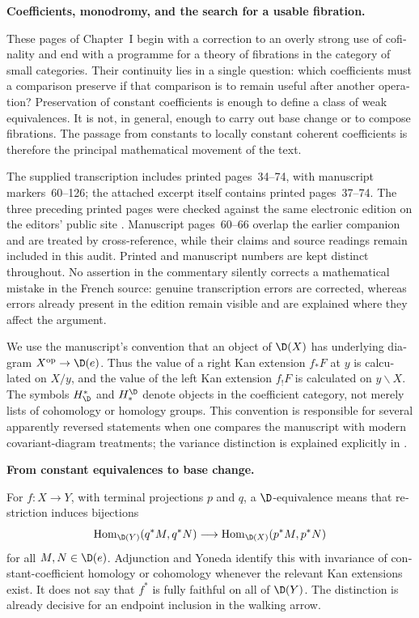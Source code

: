 \begin{otherlanguage}{english}
\noindent\textbf{Coefficients, monodromy, and the search for a usable fibration.}

These pages of Chapter~I begin with a correction to an overly strong use of cofinality and end with a programme for a theory of fibrations in the category of small categories. Their continuity lies in a single question: which coefficients must a comparison preserve if that comparison is to remain useful after another operation? Preservation of constant coefficients is enough to define a class of weak equivalences. It is not, in general, enough to carry out base change or to compose fibrations. The passage from constants to locally constant coherent coefficients is therefore the principal mathematical movement of the text.

The supplied transcription includes printed pages~34--74, with manuscript markers~60--126; the attached excerpt itself contains printed pages~37--74. The three preceding printed pages were checked against the same electronic edition on the editors' public site \citep{Grothendieck1990Derivateurs}. Manuscript pages~60--66 overlap the earlier companion and are treated by cross-reference, while their claims and source readings remain included in this audit. Printed and manuscript numbers are kept distinct throughout. No assertion in the commentary silently corrects a mathematical mistake in the French source: genuine transcription errors are corrected, whereas errors already present in the edition remain visible and are explained where they affect the argument.

We use the manuscript's convention that an object of $\D(X)$ has underlying diagram $X^{\mathrm{op}}\to\D(e)$. Thus the value of a right Kan extension $f_*F$ at $y$ is calculated on $X/y$, and the value of the left Kan extension $f_!F$ is calculated on $y\backslash X$. The symbols $H^*_{\D}$ and $H_*^{\D}$ denote objects in the coefficient category, not merely lists of cohomology or homology groups. This convention is responsible for several apparently reversed statements when one compares the manuscript with modern covariant-diagram treatments; the variance distinction is explained explicitly in \citet[Warning~2.2]{GrothPontoShulman2014}.

\medskip\noindent\textbf{From constant equivalences to base change.}

For $f:X\to Y$, with terminal projections $p$ and $q$, a $\D$-equivalence means that restriction induces bijections
\[
 \operatorname{Hom}_{\D(Y)}(q^*M,q^*N)
 \longrightarrow
 \operatorname{Hom}_{\D(X)}(p^*M,p^*N)
\]
for all $M,N\in\D(e)$. Adjunction and Yoneda identify this with invariance of constant-coefficient homology or cohomology whenever the relevant Kan extensions exist. It does not say that $f^*$ is fully faithful on all of $\D(Y)$. The distinction is already decisive for an endpoint inclusion in the walking arrow.


\end{otherlanguage}
